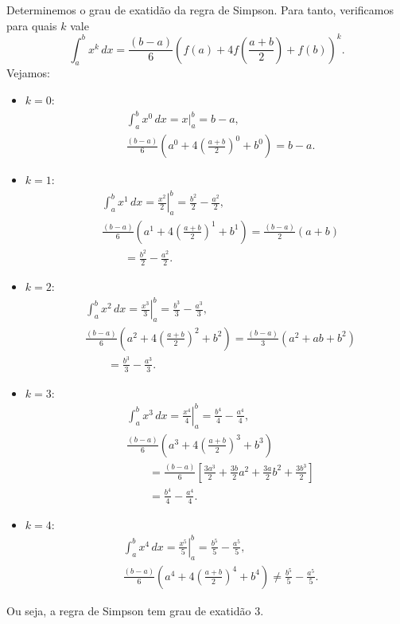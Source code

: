 \begin{ex}
  Determinemos o grau de exatidão da regra de Simpson. Para tanto, verificamos para quais $k$ vale
  \begin{equation}
    \int_a^b x^k\,dx = \frac{(b-a)}{6}\left(f(a) + 4f\left(\frac{a+b}{2}\right) + f(b)\right)^k.
  \end{equation}
Vejamos:
\begin{itemize}
\item $k=0$:
  \begin{align}
    &\int_a^b x^0\,dx = \left. x\right|_a^b = b-a,\\
    &\frac{(b-a)}{6}\left(a^0 + 4\left(\frac{a+b}{2}\right)^0 + b^0\right) = b-a.
  \end{align}
\item $k=1$:
  \begin{align}
    &\int_a^b x^1\,dx = \left. \frac{x^2}{2}\right|_a^b = \frac{b^2}{2}-\frac{a^2}{2},\\
    &\frac{(b-a)}{6}\left(a^1 + 4\left(\frac{a+b}{2}\right)^1 + b^1\right) = \frac{(b-a)}{2}(a+b) \\
    &\qquad = \frac{b^2}{2}-\frac{a^2}{2}.
  \end{align}
\item $k=2$:
  \begin{align}
    &\int_a^b x^2\,dx = \left. \frac{x^3}{3}\right|_a^b = \frac{b^3}{3} - \frac{a^3}{3},\\
    &\frac{(b-a)}{6}\left(a^2 + 4\left(\frac{a+b}{2}\right)^2 + b^2\right) = \frac{(b-a)}{3}(a^2 + ab + b^2)\\
    &\qquad = \frac{b^3}{3} - \frac{a^3}{3}.
  \end{align}
\item $k=3$:
  \begin{align}
    &\int_a^b x^3\,dx = \left. \frac{x^4}{4}\right|_a^b = \frac{b^4}{4}-\frac{a^4}{4},\\
    &\frac{(b-a)}{6}\left(a^3 + 4\left(\frac{a+b}{2}\right)^3 + b^3\right) \\
    &\qquad = \frac{(b-a)}{6}\left[\frac{3 a^{3}}{2} + \frac{3 b}{2} a^{2} + \frac{3 a}{2} b^{2} + \frac{3 b^{3}}{2}\right]\\
    &\qquad = \frac{b^4}{4}-\frac{a^4}{4}.
  \end{align}
\item $k=4$:
  \begin{align}
    &\int_a^b x^4\,dx = \left. \frac{x^5}{5}\right|_a^b = \frac{b^5}{5}-\frac{a^5}{5},\\
    &\frac{(b-a)}{6}\left(a^4 + 4\left(\frac{a+b}{2}\right)^4 + b^4\right) \neq \frac{b^5}{5}-\frac{a^5}{5}.
  \end{align}
\end{itemize}
Ou seja, a regra de Simpson tem grau de exatidão $3$.
\end{ex}

